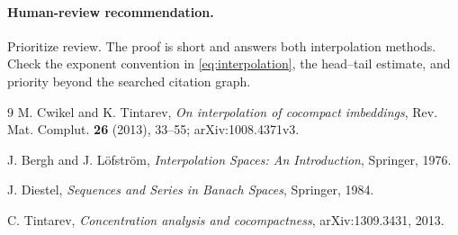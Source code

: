\documentclass[11pt]{article}
\begin{document}
\paragraph{Human-review recommendation.}
Prioritize review.  The proof is short and answers both interpolation methods.
Check the exponent convention in \eqref{eq:interpolation}, the head--tail
estimate, and priority beyond the searched citation graph.

\begin{thebibliography}{9}
M. Cwikel and K. Tintarev,
\emph{On interpolation of cocompact imbeddings},
Rev. Mat. Complut. \textbf{26} (2013), 33--55;
arXiv:1008.4371v3.

J. Bergh and J. L\"ofstr\"om,
\emph{Interpolation Spaces: An Introduction},
Springer, 1976.

J. Diestel,
\emph{Sequences and Series in Banach Spaces},
Springer, 1984.

C. Tintarev,
\emph{Concentration analysis and cocompactness},
arXiv:1309.3431, 2013.
\end{thebibliography}
\end{document}
